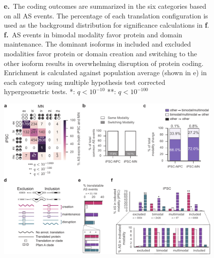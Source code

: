 \begin{figure}[h]
{\textbf{e.}~The coding outcomes are summarized in the six categories based on all AS events. The percentage of each translation configuration is used as the background distribution for significance calculations in \textbf{f}.\\
\textbf{f.}~AS events in bimodal modality favor protein and domain maintenance. The dominant isoforms in included and excluded modalities favor protein or domain creation and switching to the other isoform results in overwhelming disruption of protein coding. Enrichment is calculated against population average (shown in e) in each category using multiple hypothesis test corrected hypergeometric tests. *: $q< 10^{-10}$  **: $q< 10^{-100}$
}
\label{fig:dynamic_modalities}
\end{figure}
\clearpage
\begin{figure}[h]
\ContinuedFloat
\captionsetup{labelformat=empty}
\centering
\includegraphics[width=5.8in]{figures/dynamic_modalities.pdf}
\end{figure}
\addtocounter{figure}{1}
\clearpage


